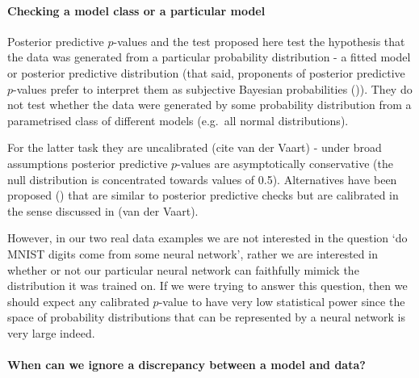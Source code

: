 \documentclass{article} %
\def\eg{e.g.\ }
\begin{document}

\paragraph{Checking a model class or a particular model}

Posterior predictive $p$-values and the test proposed here test the hypothesis that the data was generated from a particular probability distribution - a fitted model or posterior predictive distribution (that said, proponents of posterior predictive $p$-values prefer to interpret them as subjective Bayesian probabilities ()).
They do not test whether the data were generated by some probability distribution from a parametrised class of different models (\eg all normal distributions).

For the latter task they are uncalibrated (cite van der Vaart) - under broad assumptions posterior predictive $p$-values are asymptotically conservative (the null distribution is concentrated towards values of 0.5).
Alternatives have been proposed () that are similar to posterior predictive checks but are calibrated in the sense discussed in (van der Vaart).

However, in our two real data examples we are not interested in the question `do MNIST digits come from some neural network', rather we are interested in whether or not our particular neural network can faithfully mimick the distribution it was trained on.
If we were trying to answer this question, then we should expect any calibrated $p$-value to have very low statistical power since the space of probability distributions that can be represented by a neural network is very large indeed.

\paragraph{When can we ignore a discrepancy between a model and data?}
\end{document}
